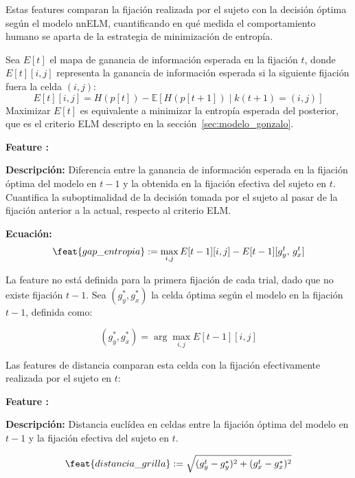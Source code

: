 Estas features comparan la fijación realizada por el sujeto con la
decisión óptima según el modelo nnELM, cuantificando en qué medida
el comportamiento humano se aparta de la estrategia de minimización
de entropía.

Sea $E[t]$ el mapa de ganancia de información esperada en la
fijación $t$, donde $E[t][i,j]$ representa la ganancia de
información esperada si la siguiente fijación fuera la celda
$(i,j)$:
\begin{equation}
    E[t][i,j] = H(p[t]) - \mathbb{E}[H(p[t+1]) \mid k(t+1) = (i,j)]
\end{equation}
Maximizar $E[t]$ es equivalente a minimizar la entropía esperada del
posterior, que es el criterio ELM descripto en la
sección~\ref{sec:modelo_gonzalo}.

\begin{featuredef}
\textbf{Feature \thetcbcounter:} 

\textbf{Descripción:} Diferencia entre la ganancia de información esperada
en la fijación óptima del modelo en $t-1$ y la obtenida en la fijación
efectiva del sujeto en $t$. Cuantifica la suboptimalidad de la decisión
tomada por el sujeto al pasar de la fijación anterior a la actual,
respecto al criterio ELM.

\textbf{Ecuación:}
\begin{equation}
    \feat{gap\_entropia} := \max_{i,j} E[t-1][i,j] -
    E[t-1][g_y^{t},\, g_x^{t}]
\end{equation}
\end{featuredef}
La feature  no está definida para la primera
fijación de cada trial, dado que no existe fijación $t-1$.
Sea $(g_y^*, g_x^*)$ la celda óptima según el modelo en la fijación
$t-1$, definida como:

\begin{equation}
    (g_y^*, g_x^*) = \arg\max_{i,j} E[t-1][i,j]
\end{equation}

Las features de distancia comparan esta celda con la fijación
efectivamente realizada por el sujeto en $t$:

\begin{featuredef}
\textbf{Feature \thetcbcounter:} 

\textbf{Descripción:} Distancia euclídea en celdas entre la fijación
óptima del modelo en $t-1$ y la fijación efectiva del sujeto en $t$.

\begin{equation}
    \feat{distancia\_grilla} := \sqrt{(g_y^{t} - g_y^*)^2 +
    (g_x^{t} - g_x^*)^2}
\end{equation}
\end{featuredef}

